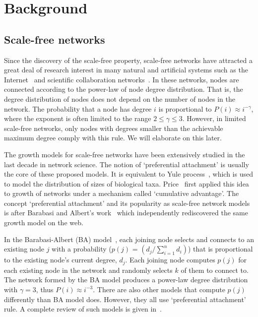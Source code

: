 \documentclass[10pt,journal,cspaper,compsoc]{IEEEtran}
\begin{document}
\section{Background}
\label{sec:back}

\subsection{Scale-free networks}

Since the discovery of the scale-free property, scale-free networks have attracted a great deal of research interest in many natural and artificial systems such as the Internet~\cite{internet} and scientific collaboration networks~\cite{collaborations}. In these networks, nodes are connected according to the power-law of node degree distribution. That is, the degree distribution of nodes does not depend on the number of nodes in the network. The probability that a node has degree $i$ is proportional to $P(i)\approx i^{-\gamma}$, where the exponent is often limited to the range $2\leq \gamma \leq 3$. However, in limited scale-free networks, only nodes with degrees smaller than the achievable maximum degree comply with this rule. We will elaborate on this later.



The growth models for scale-free networks have been extensively studied in the last decade in network science. The notion of `preferential attachment' is usually the core of these proposed models. It is equivalent to Yule process~\cite{yule}, which is used to model the distribution of sizes of biological taxa. Price~\cite{price} first applied this idea to growth of networks under a mechanism called `cumulative advantage'. The concept `preferential attachment' and its popularity as scale-free network models is after Barabasi and Albert's work~\cite{ba} which independently rediscovered the same growth model on the web.

In the Barabasi-Albert (BA) model~\cite{ba}, each joining node selects and connects to an existing node $j$ with a probability ($p(j)$ = $\left(d_j/{\sum_{i=1}^{n}d_i}\right)$) that is proportional to the existing node's current degree, $d_j$. Each joining node computes $p(j)$ for each existing node in the network and randomly selects $k$ of them to connect to. The network formed by the BA model produces a power-law degree distribution with $\gamma = 3$, thus $P(i) \approx i^{-3}$. There are also other models that compute $p(j)$ differently than BA model does. However, they all use `preferential attachment' rule. A complete review of such models is given in~\cite{doro}.
\end{document}

